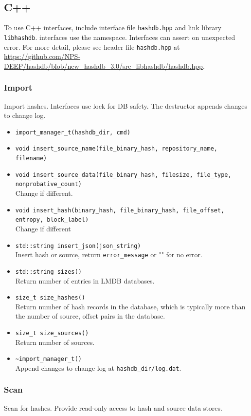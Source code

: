 \documentclass[11pt,fleqn]{article} %
\begin{document}
\subsection{C++}
To use C++ interfaces, include interface file \verb+hashdb.hpp+ and link \hdb library \verb+libhashdb+. \hdb interfaces use the \hdb namespace. Interfaces can assert on unexpected error. For more detail, please see \hdb header file \texttt{hashdb.hpp} at \url{https://github.com/NPS-DEEP/hashdb/blob/new_hashdb_3.0/src_libhashdb/hashdb.hpp}.

\subsubsection{Import}
Import hashes. Interfaces use lock for DB safety. The destructor appends changes to change log.

\begin{itemize}
\item \verb+import_manager_t(hashdb_dir, cmd)+
\item \verb+void insert_source_name(file_binary_hash, repository_name, filename)+
\item \verb+void insert_source_data(file_binary_hash, filesize, file_type, nonprobative_count)+\\
Change if different.
\item \verb+void insert_hash(binary_hash, file_binary_hash, file_offset, entropy, block_label)+\\
Change if different
\item \verb+std::string insert_json(json_string)+\\
Insert hash or source, return \verb+error_message+ or "" for no error.
\item \verb+std::string sizes()+\\
Return number of entries in LMDB databases.
\item \verb+size_t size_hashes()+\\
Return number of hash records in the database, which is typically more than the number of source, offset pairs in the database.
\item \verb+size_t size_sources()+\\
Return number of sources.
\item \verb+~import_manager_t()+\\
Append changes to change log at \verb+hashdb_dir/log.dat+.
\end{itemize}

\subsubsection{Scan}
Scan for hashes. Provide read-only access to hash and source data stores.
\end{document}
